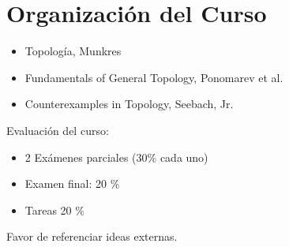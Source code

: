 \section{Organización del Curso}
\begin{itemize}
	\item Topología, Munkres
	\item Fundamentals of General Topology, Ponomarev et al.
	\item Counterexamples in Topology, Seebach, Jr.
\end{itemize}
Evaluación del curso:
\begin{itemize}
	\item 2 Exámenes parciales (30\% cada uno)
	\item Examen final: 20 \%
	\item Tareas 20 \%
\end{itemize}
Favor de referenciar ideas externas.